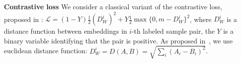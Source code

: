 \documentclass[sigconf, anonymous]{acmart}
\begin{document}



\textbf{Contrastive loss} We consider a classical variant of the contrastive loss, proposed in
\citep{Hadsell2006DimensionalityRB}: $
    \mathcal{L}
        = (1 - Y) \frac12 (D_W^i)^2
        + Y \frac12\max\{0, m - D_W^i \}^2
$, where $D_W^i$ is a distance function between embeddings in $i$-th labeled sample pair, the $Y$ is a binary variable identifying that the pair is positive.  As proposed in~\citep{Hadsell2006DimensionalityRB}, we use euclidean distance function: $
    D_W^i = D(A, B) = \sqrt{\sum_i(A_i - B_i)^2}
$.

\end{document}
